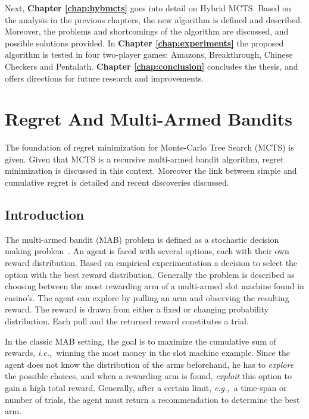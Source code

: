 \documentclass{kecsmstr}
\newcommand{\eg}{{\it e.g.,}~}
\newcommand{\ie}{{\it i.e.,}~}
\begin{document}
Next, \textbf{Chapter \ref{chap:hybmcts}} goes into detail on Hybrid MCTS. Based on the analysis in the previous chapters, the new algorithm is defined and described. Moreover, the problems and shortcomings of the algorithm are discussed, and possible solutions provided. In \textbf{Chapter \ref{chap:experiments}} the proposed algorithm is tested in four two-player games: Amazons, Breakthrough, Chinese Checkers and Pentalath. \textbf{Chapter \ref{chap:conclusion}} concludes the thesis, and offers directions for future research and improvements.

\chapter{Regret And Multi-Armed Bandits}
\label{chap:mab}
\begin{chaptercontents} The foundation of regret minimization for Monte-Carlo Tree Search (MCTS) is given. Given that MCTS is a recursive multi-armed bandit algorithm, regret minimization is discussed in this context. Moreover the link between simple and cumulative regret is detailed and recent discoveries discussed.
\end{chaptercontents}

\section{Introduction}
The multi-armed bandit (MAB) problem is defined as a stochastic decision making problem~. An agent is faced with several options, each with their own reward distribution. Based on empirical experimentation a decision to select the option with the best reward distribution. Generally the problem is described as choosing between the most rewarding arm of a multi-armed slot machine found in casino's. The agent can explore by pulling an arm and observing the resulting reward. The reward is drawn from either a fixed or changing probability distribution. Each pull and the returned reward constitutes a trial. 

In the classic MAB setting, the goal is to maximize the cumulative sum of rewards, \ie winning the most money in the slot machine example. Since the agent does not know the distribution of the arms beforehand, he has to \emph{explore} the possible choices, and when a rewarding arm is found, \emph{exploit} this option to gain a high total reward. Generally, after a certain limit, \eg a time-span or number of trials, the agent must return a recommendation to determine the best arm.
\end{document}
